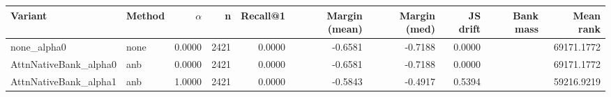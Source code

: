 \begin{tabular}{l l r r r r r r r r}
\toprule
Variant & Method & $\alpha$ & n & Recall@1 & Margin (mean) & Margin (med) & JS drift & Bank mass & Mean rank \\
\midrule
none\_alpha0 & none & 0.0000 & 2421 & 0.0000 & -0.6581 & -0.7188 & 0.0000 &  & 69171.1772 \\
AttnNativeBank\_alpha0 & anb & 0.0000 & 2421 & 0.0000 & -0.6581 & -0.7188 & 0.0000 &  & 69171.1772 \\
AttnNativeBank\_alpha1 & anb & 1.0000 & 2421 & 0.0000 & -0.5843 & -0.4917 & 0.5394 &  & 59216.9219 \\
\bottomrule
\end{tabular}
